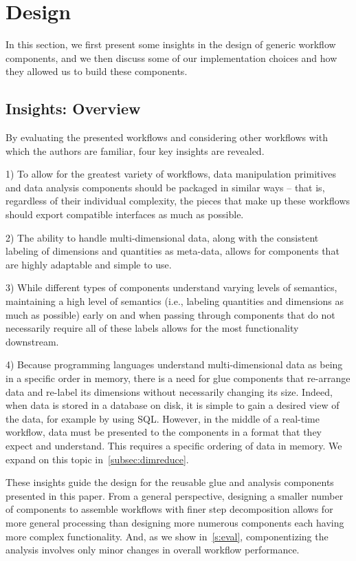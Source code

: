 \section{Design}
\label{s:design}




In this section, we first present
some insights in the design of
generic workflow components,
and we then discuss
some of our implementation choices
and how they allowed us to 
build these components.

\subsection{Insights: Overview}

By evaluating the presented workflows
and considering other workflows with
which the authors are familiar,
four key insights are revealed.

1) To allow for the greatest variety of workflows,
data manipulation primitives and data analysis components
should be packaged in similar ways -- that is,
regardless of their individual complexity,
the pieces that make up these workflows
should export compatible interfaces as much as possible.

2) The ability to handle multi-dimensional data,
along with the consistent labeling of
dimensions and quantities as meta-data,
allows for components that are highly
adaptable and simple to use.

3) While different types of components understand
varying levels of semantics, maintaining a
high level of semantics (i.e., labeling
quantities and dimensions as much
as possible) early on and when passing
through components that do not necessarily
require all of these labels allows for the most
functionality downstream.

4) Because programming languages understand
multi-dimensional data as being in a
specific order in memory, there is a need for
glue components that re-arrange data and
re-label its dimensions without necessarily
changing its size. Indeed, when data is stored
in a database on disk, it is simple to gain a desired
view of the data, for example by using SQL.
However, in the middle of a real-time workflow,
data must be presented to the components in a
format that they expect and understand.
This requires a specific ordering of data in
memory. We expand on this topic in~\autoref{subsec:dimreduce}.

These insights guide the design for the
reusable glue and analysis
components presented in this
paper. From a general perspective, designing a smaller number of
components to assemble workflows with finer step decomposition
allows for more general processing
than designing more numerous components each having more
complex functionality.
And, as we show in~\autoref{s:eval}, componentizing
the analysis involves only minor changes
in overall workflow performance.

